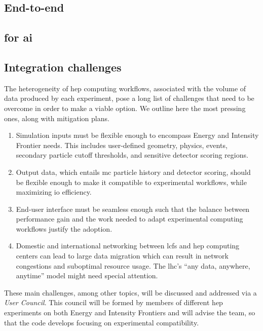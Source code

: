 \subsection{End-to-end \celeritas}
\label{sec:end-to-end}

\subsection{\celeritas for \ac{ai}}
\label{sec:celeritas-ai}

\subsection{Integration challenges}

The heterogeneity of \ac{hep} computing workflows, associated with the volume of
data produced by each experiment, pose a long list of challenges that need to be
overcome in order to make \celeritas a viable option. We outline here the most pressing ones, along with mitigation plans. 
\begin{enumerate}[itemsep=0pt]
  \item Simulation inputs must be flexible enough to encompass Energy and
    Intensity Frontier needs. This includes user-defined geometry, physics,
    events, secondary particle cutoff thresholds, and sensitive detector scoring
    regions.
  \item Output data, which entails \ac{mc} particle history and detector
    scoring, should be flexible enough to make it compatible to experimental
    workflows, while maximizing \ac{io} efficiency.
  \item End-user interface must be seamless enough such that the balance between
    performance gain and the work needed to adapt experimental computing
    workflows justify the adoption.
  \item Domestic and international networking between \acp{lcf} and \ac{hep}
    computing centers can lead to large data migration which can result in
    network congestions and suboptimal resource usage.  The \ac{lhc}'s ``any
    data, anywhere, anytime'' model \cite{hep-network-requirements} might need
    special attention.
\end{enumerate}

These main challenges, among other topics, will be discussed and addressed via a
\celeritas \emph{User Council}. This council will be formed by members of
different \ac{hep} experiments on both Energy and Intensity Frontiers and will
advise the \celeritas team, so that the code develops focusing on experimental
compatibility.
